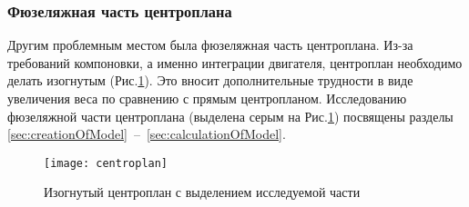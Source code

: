 \subsubsection{Фюзеляжная часть центроплана}

Другим проблемным местом была фюзеляжная часть центроплана. Из-за требований компоновки, а именно интеграции двигателя, центроплан необходимо делать изогнутым (Рис.\ref{fig:centroplan}). Это вносит дополнительные трудности в виде увеличения веса по сравнению с прямым центропланом. Исследованию фюзеляжной части центроплана (выделена серым на Рис.\ref{fig:centroplan}) посвящены разделы \ref{sec:creationOfModel}~--~\ref{sec:calculationOfModel}.

\begin{figure}[ht]
\centering
\texttt{[image: centroplan]}
\caption{Изогнутый центроплан с выделением исследуемой части}
\label{fig:centroplan}
\end{figure}